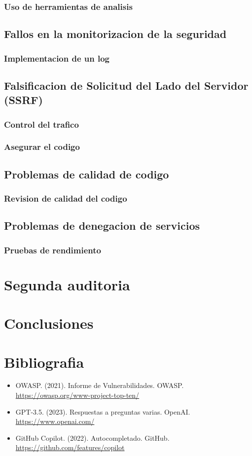 \documentclass{report}
\begin{document}
            \subsection{Uso de herramientas de analisis}
        \clearpage
        \section{Fallos en la monitorizacion de la seguridad}
            \subsection{Implementacion de un log}
        \clearpage
        \section{Falsificacion de Solicitud del Lado del Servidor (SSRF)}
            \subsection{Control del trafico}
            \subsection{Asegurar el codigo}
        \clearpage
        \section{Problemas de calidad de codigo}
            \subsection{Revision de calidad del codigo}
        \clearpage
        \section{Problemas de denegacion de servicios}
            \subsection{Pruebas de rendimiento}
    \chapter{Segunda auditoria}
    \chapter{Conclusiones}
    \chapter{Bibliografia}
        \begin{itemize}
            \item OWASP. (2021). Informe de Vulnerabilidades. OWASP. \url{https://owasp.org/www-project-top-ten/}
            \item GPT-3.5. (2023). Respuestas a preguntas varias. OpenAI. \url{https://www.openai.com/}
            \item GitHub Copilot. (2022). Autocompletado. GitHub. \url{https://github.com/features/copilot}
        \end{itemize}
\end{document}
